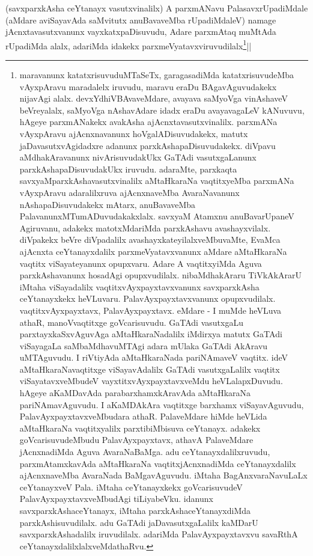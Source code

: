 \begin{artha} 
(savxparxkAsha ceYtanayx vasutxvinalilx) A parxmANavu 
PalasavxrUpadiMdale (aMdare aviSayavAda saMvitutx anuBavaveMba 
rUpadiMdaleV) namage jAcnxtavasutxvanunx vayxkatxpaDisuvudu, Adare 
parxmAtaq muMtAda rUpadiMda alalx, adariMda idakekx 
parxmeVyatavxviruvudilalx\footnote[1]{maravanunx 
katatxrisuvuduMTaSeTx, garagasadiMda katatxrisuvudeMba vAyxpAravu 
maradalelx iruvudu, maravu eraDu BAgavAguvudakekx nijavAgi alalx. 
devxYdhiVBAvaveMdare, avayava saMyoVga vinAshaveV beVreyalalx, 
saMyoVga nAshavAdare idadx eraDu avayavagaLeV kANuvuvu, hAgeye 
parxmANakekx avakAsha ajAcnxtavasutxvinalilx. parxmANa vAyxpAravu 
ajAcnxnavanunx hoVgalADisuvudakekx, matutx jaDavasutxvAgidadxre 
adanunx parxkAshapaDisuvudakekx. diVpavu aMdhakAravanunx 
nivArisuvudakUkx GaTAdi vasutxgaLanunx parxkAshapaDisuvudakUkx 
iruvudu. adaraMte, parxkaqta savxyaMparxkAshavasutxvinalilx 
aMtaHkaraNa vaqtitxyeMba parxmANa vAyxpAravu adaralilxruva 
ajAcnxnaveMba AvaraNavanunx nAshapaDisuvudakekx mAtarx, anuBavaveMba 
PalavanunxMTumADuvudakakxlalx. savxyaM Atamxnu anuBavarUpaneV 
Agiruvanu, adakekx matotxMdariMda parxkAshavu avashayxvilalx. 
diVpakekx beVre diVpadalilx avashayxkateyilalxveMbuvaMte, EvaMca 
ajAcnxta ceYtanayxdalilx parxmeVyatavxvanunx aMdare aMtaHkaraNa 
vaqtitx viSayateyanunx opupxvaru. Adare A vaqtitxyiMda Aguva 
parxkAshavanunx hosadAgi opupxvudilalx. nibaMdhakAraru TiVkAkArarU 
iMtaha viSayadalilx vaqtitxvAyxpayxtavxvanunx savxparxkAsha 
ceYtanayxkekx heVLuvaru. PalavAyxpayxtavxvanunx opupxvudilalx. 
vaqtitxvAyxpayxtavx, PalavAyxpayxtavx. eMdare - I muMde heVLuva athaR, 
manoVvaqtitxge goVcarisuvudu. GaTAdi vasutxgaLu parxtayxkaSxvAguvAga 
aMtaHkaraNadalilx iMdirxya matutx GaTAdi viSayagaLa saMbaMdhavuMTAgi 
adara mUlaka GaTAdi AkAravu uMTAguvudu. I riVtiyAda aMtaHkaraNada 
pariNAmaveV vaqtitx. ideV aMtaHkaraNavaqtitxge viSayavAdalilx GaTAdi 
vasutxgaLalilx vaqtitx viSayatavxveMbudeV vayxtitxvAyxpayxtavxveMdu 
heVLalapxDuvudu. hAgeye aKaMDavAda parabarxhamxkAravAda aMtaHkaraNa 
pariNAmavAguvudu. I aKaMDAkAra vaqtitxge barxhamx viSayavAguvudu, 
PalavAyxpayxtavxveMbudara athaR. PalaveMdare hiMde heVLida aMtaHkaraNa 
vaqtitxyalilx parxtibiMbisuva ceYtanayx. adakekx goVcarisuvudeMbudu 
PalavAyxpayxtavx, athavA PalaveMdare jAcnxnadiMda Aguva AvaraNaBaMga. 
adu ceYtanayxdalilxruvudu, parxmAtamxkavAda aMtaHkaraNa 
vaqtitxjAcnxnadiMda ceYtanayxdalilx ajAcnxnaveMba AvaraNada 
BaMgavAguvudu. iMtaha BagAnxvaraNavuLaLx ceYtanayxveV Pala. iMtaha 
ceYtanayxkekx goVcarisuvudeV PalavAyxpayxtavxveMbudAgi tiLiyabeVku. 
idanunx savxparxkAshaceYtanayx, iMtaha parxkAshaceYtanayxdiMda 
parxkAshisuvudilalx. adu GaTAdi jaDavasutxgaLalilx kaMDarU 
savxparxkAshadalilx iruvudilalx. adariMda PalavAyxpayxtavxvu savaRthA 
ceYtanayxdalilxlalxveMdathaRvu.}||
\end{artha}

